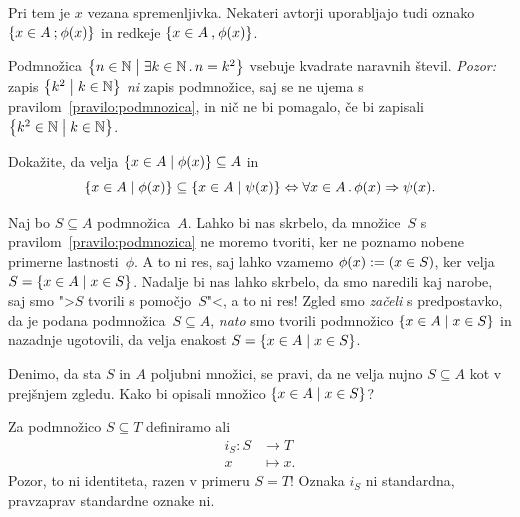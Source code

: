 \noindent
Pri tem je $x$ vezana spremenljivka.
%
Nekateri avtorji uporabljajo tudi oznako $\left\{x \in A \mathbin{;} \phi(x)\right\}$ in redkeje $\left\{x \in A \mathbin{,} \phi(x)\right\}$.

\begin{zgled}
  Podmnožica $\left\{n \in \mathbb{N} \; \middle| \; \exists k \in \mathbb{N} \,.\, n = k^2\right\}$ vsebuje kvadrate naravnih števil.
  \emph{Pozor:} zapis $\left\{k^2 \; \middle| \; k \in \mathbb{N}\right\}$ \emph{ni} zapis podmnožice, saj se ne ujema s pravilom~\ref{pravilo:podmnozica}, in nič ne bi pomagalo, če bi zapisali $\left\{k^2 \in \mathbb{N} \; \middle| \; k \in \mathbb{N}\right\}$.
\end{zgled}


\begin{vaja}
  Dokažite, da velja $\left\{ x \in A \; \middle| \; \phi(x) \right\} \subseteq A$ in
  \begin{equation*}
    \left\{x \in A \; \middle| \; \phi(x)\right\} \subseteq \left\{x \in A \; \middle| \; \psi(x)\right\} \Leftrightarrow
    \forall x \in A \,.\, \phi(x) \Rightarrow \psi(x).
  \end{equation*}
\end{vaja}

\begin{zgled}
  Naj bo $S \subseteq A$ podmnožica~$A$.
  Lahko bi nas skrbelo, da množice~$S$ s pravilom~\ref{pravilo:podmnozica} ne moremo tvoriti, ker ne poznamo nobene primerne lastnosti~$\phi$. A to ni res, saj lahko vzamemo $\phi(x) \mathrel{{:}{=}} (x \in S)$, ker velja $S = \left\{x \in A \; \middle| \; x \in S\right\}$.
  Nadalje bi nas lahko skrbelo, da smo naredili kaj narobe, saj smo ">$S$ tvorili s pomočjo~$S$"<, a to ni res!
  Zgled smo \emph{začeli} s predpostavko, da je podana podmnožica~$S \subseteq A$, \emph{nato} smo tvorili podmnožico $\left\{x \in A \; \middle| \; x \in S\right\}$ in nazadnje ugotovili, da velja enakost $S = \left\{x \in A \; \middle| \; x \in S\right\}$.
\end{zgled}

\begin{vaja}
  Denimo, da sta $S$ in $A$ poljubni množici, se pravi, da ne velja nujno $S \subseteq A$ kot v prejšnjem zgledu.
  Kako bi opisali množico $\left\{x \in A \; \middle| \; x \in S\right\}$?
\end{vaja}

Za podmnožico $S \subseteq T$ definiramo  ali 
%
\begin{align*}
   i_S : S &\to T\\
         x &\mapsto x.
\end{align*}
%
Pozor, to ni identiteta, razen v primeru $S = T$!
Oznaka $i_S$ ni standardna, pravzaprav standardne oznake ni.


